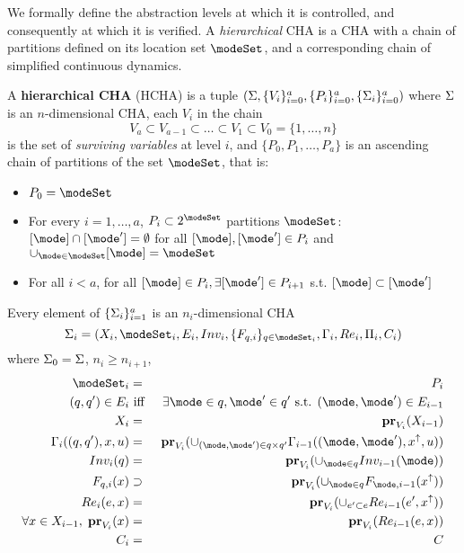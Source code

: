 
We formally define the abstraction levels at which it is controlled, and consequently at which it is verified.
A \emph{hierarchical} CHA is a CHA with a chain of partitions defined on its location set $\modeSet$, and a corresponding chain of simplified continuous dynamics.
\begin{defn}
	A \textbf{hierarchical CHA} (HCHA) is a tuple 
	$(\Sigma, \{V_i\}_{i=0}^{a}, \{P_i\}_{i=0}^{a}, \{\Sigma_i\}_{i=0}^{a})$ where 
	$\Sigma$ is an $n$-dimensional CHA, 
	each $V_i$ in the chain 
	\[V_a \subset V_{a-1} \subset \ldots \subset V_1 \subset V_0=\{1,\ldots,n\}\]
	is the set of \emph{surviving variables} at level $i$, and 
	$\{P_0,P_1,\ldots,P_a\}$ is an ascending chain of partitions of the set $\modeSet$, that is:
	\begin{itemize}
		\item $P_0 = \modeSet$
		\item For every $i =1,\ldots,a$, $P_i \subset 2^\modeSet$ partitions $\modeSet$: $[\mode] \cap [\mode'] = \emptyset$ for all $[\mode],[\mode'] \in P_i$ and $\cup_{\mode\in \modeSet}[\mode] = \modeSet$
		\item For all $i<a$, for all $[\mode]\in P_i, \exists [\mode'] \in P_{i+1}$ s.t. $[\mode] \subset [\mode']$ 
	\end{itemize}
	Every element of $\{\Sigma_i\}_{i=1}^{a}$ is an $n_i$-dimensional CHA 
	\[\Sys_i = (\stSet_i, \modeSet_i, E_i, Inv_i, \{F_{q,i}\}_{q \in \modeSet_i}, \guard_i, \reset_i, \funcOut_i, C_i)\]
	where  $\Sigma_0 = \Sigma$,
	$n_i \geq n_{i+1}$,
	\begin{eqnarray*}
		\modeSet_i &=& P_i
		\\
		(q,q') \in E_i &\text{ iff }& \exists \mode \in q, \mode' \in q' \text{ s.t. } (\mode,\mode') \in E_{i-1}		
		\\
		\stSet_i & = & \proj{\stSet_{i-1}}{V_i} 
		\\
		\guard_i((q,q'),x,u) &=& \proj{\cup_{(\mode,\mode') \in q\times q'} \guard_{i-1}((\mode,\mode'),x^\uparrow,u) }{V_i}
		\\
		Inv_i(q) &=& \proj{ \cup_{\mode \in q}Inv_{i-1}(\mode)}{V_i}
		\\
		F_{q,i}(x) &\supset & \proj{\cup_{\mode \in q}F_{\mode,i-1}(x^\uparrow)}{V_i}
		\\
		\reset_i(e,x) &=& \proj{\cup_{e' \subset e}\reset_{i-1}(e',x^{\uparrow})}{V_i}
		\\
		\forall x \in \stSet_{i-1},\; \proj{x}{V_i} &=& \proj{\reset_{i-1}(e,x)}{V_i}
		\\
		C_i &=& C
	\end{eqnarray*}
	
\end{defn}
